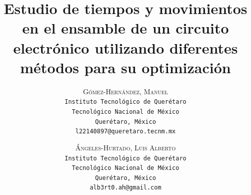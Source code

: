     \lfoot{ \thepage}
    
    \setlength{\droptitle}{-5\baselineskip} %
    \title{\textbf{Estudio de tiempos y movimientos en el ensamble de un circuito electrónico utilizando diferentes métodos para su optimización }} %
    
     \author{ 
     \textsc{Gómez-Hernández, Manuel}\\ 
     \texttt{ Instituto Tecnológico de Querétaro } \\ 
     \texttt{ Tecnológico Nacional de México } \\ 
     \texttt{Querétaro, México}\\ 
     \texttt{l22140897@queretaro.tecnm.mx} 
     \and 
     \textsc{Ángeles-Hurtado, Luis Alberto}\\ 
     \texttt{ Instituto Tecnológico de Querétaro } \\ 
     \texttt{ Tecnológico Nacional de México } \\ 
     \texttt{Querétaro, México}\\ 
     \texttt{alb3rt0.ah@gmail.com} 
    }
    
